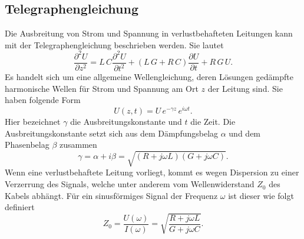 \subsection{Telegraphengleichung}
Die Ausbreitung von Strom und Spannung in verlustbehafteten Leitungen kann mit der Telegraphengleichung beschrieben werden. Sie lautet
\begin{equation}
  \frac{\partial^2 U}{\partial z^2} = L\,C\frac{\partial^2 U}{\partial t^2}+(L\,G + R\,C)\frac{\partial U}{\partial t}+R\,G\,U.
\end{equation}
Es handelt sich um eine allgemeine Wellengleichung, deren Lösungen gedämpfte harmonische Wellen für Strom und Spannung am Ort $z$ der Leitung sind. Sie haben folgende Form
\begin{equation}
  U(z,t)=U\,e^{-\gamma z}\,e^{i\omega t}.
\end{equation}
Hier bezeichnet $\gamma$ die Ausbreitungskonstante und $t$ die Zeit. Die Ausbreitungskonstante setzt sich aus dem Dämpfungsbelag $\alpha$ und dem Phasenbelag $\beta$ zusammen
\begin{equation}
  \gamma =\alpha+i\beta=\sqrt{(R+j\omega L)(G+j\omega C)}.
\end{equation}
Wenn eine verlustbehaftete Leitung vorliegt, kommt es wegen Dispersion zu einer Verzerrung des Signals, welche unter anderem vom Wellenwiderstand $Z_0$ des Kabels abhängt. Für ein sinusförmiges Signal der Frequenz $\omega$ ist dieser wie folgt definiert
\begin{equation}
  \label{eq:Z}
  Z_0=\frac{U(\omega)}{I(\omega)}=\sqrt{\frac{R+j\omega L}{G+j\omega C}}.
\end{equation}

